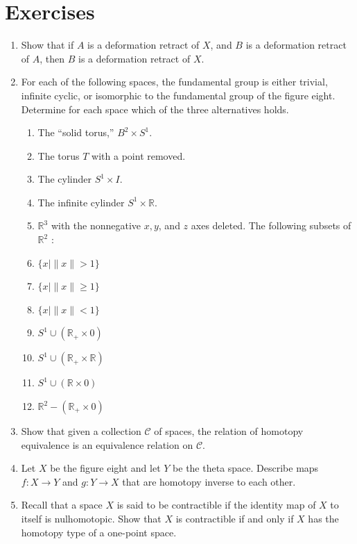 \section*{Exercises}
\begin{enumerate}[itemsep=0.4em, parsep=0pt, topsep=0pt, partopsep=0pt, leftmargin=*, label=\arabic*., ref=\arabic*]
\item Show that if \(A\) is a deformation retract of \(X\), and \(B\) is a deformation retract of \(A\), then \(B\) is a deformation retract of \(X\).
\item For each of the following spaces, the fundamental group is either trivial, infinite cyclic, or isomorphic to the fundamental group of the figure eight. Determine for each space which of the three alternatives holds.
 \begin{enumerate}[itemsep=0.2em, parsep=0pt, topsep=0pt, partopsep=0pt, leftmargin=*, label=(\alph*), align=left]
 \item The ``solid torus,'' \(B^{2} \times {S}^{1}\).
 \item The torus \(T\) with a point removed.
 \item The cylinder \(S^{1} \times I\).
 \item The infinite cylinder \(S^{1} \times \mathbb{R}\).
 \item \(\mathbb{R}^{3}\) with the nonnegative \(x,y\), and \(z\) axes deleted. The following subsets of \(\mathbb{R}^{2}\) :
 \item \(\{ x \mid \parallel x\parallel > 1\}\)
 \item \(\{ x \mid \parallel x\parallel \geq 1\}\)
 \item \(\{ x \mid \parallel x\parallel < 1\}\)
 \item \(S^{1} \cup ( {\mathbb{R}_{ + } \times 0})\)
 \item \(S^{1} \cup ( {\mathbb{R}_{ + } \times \mathbb{R}})\)
 \item \(S^{1} \cup ( {\mathbb{R} \times 0})\)
 \item \(\mathbb{R}^{2} - ( {\mathbb{R}_{ + } \times 0})\)
 \end{enumerate}
\item Show that given a collection \(\mathcal{C}\) of spaces, the relation of homotopy equivalence is an equivalence relation on \(\mathcal{C}\).
\item Let \(X\) be the figure eight and let \(Y\) be the theta space. Describe maps \(f : X \rightarrow Y\) and \(g : Y \rightarrow X\) that are homotopy inverse to each other.
\item Recall that a space \(X\) is said to be contractible if the identity map of \(X\) to itself is nulhomotopic. Show that \(X\) is contractible if and only if \(X\) has the homotopy type of a one-point space.

\end{enumerate}
